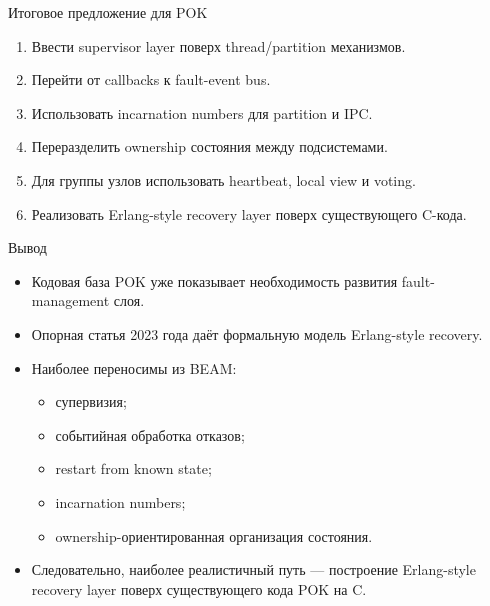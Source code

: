 \documentclass[aspectratio=169]{beamer}
\begin{document}
	\begin{frame}{Итоговое предложение для POK}
		\begin{enumerate}
			\item Ввести supervisor layer поверх thread/partition механизмов.
			\item Перейти от callbacks к fault-event bus.
			\item Использовать incarnation numbers для partition и IPC.
			\item Переразделить ownership состояния между подсистемами.
			\item Для группы узлов использовать heartbeat, local view и voting.
			\item Реализовать Erlang-style recovery layer поверх существующего C-кода.
		\end{enumerate}
	\end{frame}
	
	\begin{frame}{Вывод}
		\begin{itemize}
			\item Кодовая база POK уже показывает необходимость развития fault-management слоя.
			\item Опорная статья 2023 года даёт формальную модель Erlang-style recovery.
			\item Наиболее переносимы из BEAM:
			\begin{itemize}
				\item супервизия;
				\item событийная обработка отказов;
				\item restart from known state;
				\item incarnation numbers;
				\item ownership-ориентированная организация состояния.
			\end{itemize}
			\item Следовательно, наиболее реалистичный путь --- построение Erlang-style recovery layer поверх существующего кода POK на C.
		\end{itemize}
	\end{frame}

	
\end{document}
